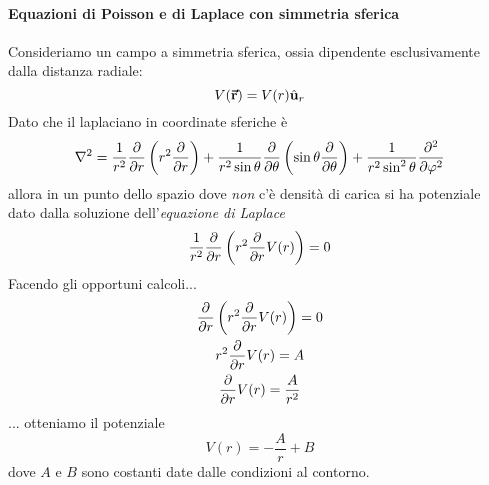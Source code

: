 \paragraph{Equazioni di Poisson e di Laplace con simmetria sferica}
Consideriamo un campo a simmetria sferica, ossia dipendente esclusivamente dalla distanza radiale:
\begin{equation*}
	V(\vb*{\va{r}})=V(r)\hat{\mathbf{u}}_r
\end{equation*}
Dato che il laplaciano in coordinate sferiche è
	\begin{equation*}
		\laplacian=\frac{1}{r^2}\pdv{r}\left(r^2\pdv{r}\right)+\frac{1}{r^2\sin\theta}\pdv{\theta}\left(\sin\theta\pdv{\theta}\right)+\frac{1}{r^2\sin^2\theta}\pdv[2]{\phi}
	\end{equation*}
allora in un punto dello spazio dove \textit{non} c'è densità di carica si ha potenziale dato dalla soluzione dell'\textit{equazione di Laplace}
\begin{equation*}
	\frac{1}{r^2}\pdv{r}\left(r^2\pdv{r}V(r)\right)=0
\end{equation*}
Facendo gli opportuni calcoli...
\begin{gather*}
	\pdv{r}\left(r^2\pdv{r}V(r)\right)=0\\
	r^2\pdv{r}V(r)=A\\
	\pdv{r}V(r)=\frac{A}{r^2}\\
\end{gather*}
... otteniamo il potenziale
\begin{equation}
	V(r)=-\frac{A}{r}+B
\end{equation}
dove $A$ e $B$ sono costanti date dalle condizioni al contorno.

